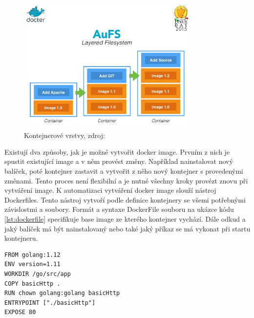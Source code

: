\begin{figure}[H]
  \begin{centering}
    
    \includegraphics[width=0.8\textwidth]{images/container-layers.jpg}
    \par
	  \caption{Kontejnerové vrstvy\label{fig:container-layers}, zdroj: }
    \end{centering}
\end{figure}

Existují dva způsoby, jak je možné vytvořit docker image. Prvním z nich je spustit existující image a v něm provést změny. Například nainstalovat nový balíček, poté kontejner zastavit a vytvořit z něho nový kontejner s provedenými změnami. Tento proces není flexibilní a je nutné všechny kroky provézt znovu při vytváření image. \linebreak K automatizaci vytváření docker image slouží nástroj Dockerfiles. Tento nástroj vytvoří podle definice kontejnery se všemi potřebnými závislostmi a soubory. Formát a syntaxe DockerFile souboru na ukázce kódu \ref{lst:dockerfile} specifikuje base image ze kterého kontejner vychází. Dále odkud a jaký balíček má být nainstalovaný nebo také jaký příkaz se má vykonat při startu kontejneru. \par

\begin{centering}
	\begin{lstlisting}[caption={Příklad docker file souboru},label=lst:dockerfile]
FROM golang:1.12
ENV version=1.11
WORKDIR /go/src/app
COPY basicHttp .
RUN chown golang:golang basicHttp
ENTRYPOINT ["./basicHttp"]
EXPOSE 80
\end{lstlisting}
\end{centering}

